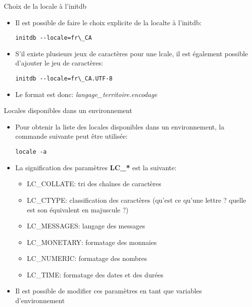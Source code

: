 \begin{frame}[fragile]{Choix de la locale à l'initdb}

\begin{itemize}
   \item Il est possible de faire le choix explicite de la localte à l'initdb:
\begin{tiny}
\begin{Verbatim}[commandchars=\&\{\}]
initdb --locale=fr\_CA
\end{Verbatim}
\end{tiny}
   \item S'il existe plusieurs jeux de caractères pour une lcale, il est également possible d'ajouter le jeu de caractères:
\begin{tiny}
\begin{Verbatim}[commandchars=\&\{\}]
initdb --locale=fr\_CA.UTF-8
\end{Verbatim}
\end{tiny}
   \item Le format est donc: \textit{langage\_territoire.encodage}
\end{itemize}

\end{frame}


\begin{frame}[fragile]{Locales disponibles dans un environnement}

\begin{itemize}
   \item Pour obtenir la liste des locales disponibles dans un environnement, la commande suivante peut être utilisée:
\begin{tiny}
\begin{Verbatim}[commandchars=\&\{\}]
locale -a
\end{Verbatim}
\end{tiny}
   \item La signification des paramètres \textbf{LC\_*} est la suivante:
   \begin{itemize}
      \item LC\_COLLATE: tri des chaînes de caractères
      \item LC\_CTYPE: classification des caractères (qu'est ce qu'une lettre ? quelle est son équivalent en majuscule ?)
      \item LC\_MESSAGES: langage des messages
      \item LC\_MONETARY: formatage des monnaies
      \item LC\_NUMERIC: formatage des nombres
      \item LC\_TIME: formatage des dates et des durées
   \end{itemize}
   \item Il est possible de modifier ces paramètres en tant que variables d'environnement
\end{itemize}

\end{frame}


